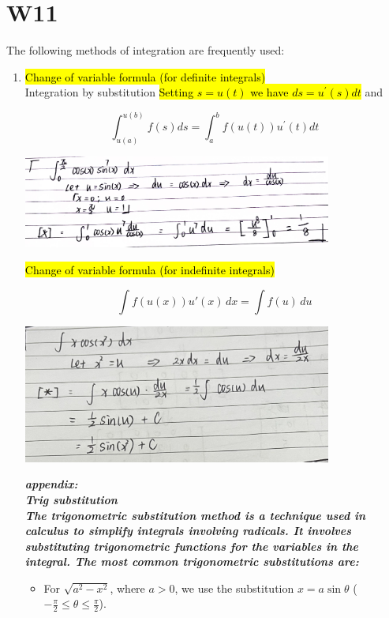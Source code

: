 \documentclass[10pt]{article}
\begin{document}
\section{W11}
The following methods of integration are frequently used:
\begin{enumerate}

\item \hl{Change of variable formula (for definite integrals)\\}Integration by substitution \hl{Setting $s=u(t)$ we have $d s=u^{\prime}(s) d t$} and

$$
\int_{u(a)}^{u(b)} f(s) d s=\int_{a}^{b} f(u(t)) u^{\prime}(t) d t
$$

\includegraphics[width=0.8\textwidth]{images/W11-2.jpeg}


\hl{Change of variable formula (for indefinite integrals)}

\[
\int f(u(x)) u'(x)\, dx = \int f(u)\, du
\]

\includegraphics[width=0.8\textwidth]{images/W11-1.jpeg}\\


\newpage



\textbf{\textit{appendix:\\Trig substitution\\The trigonometric substitution method is a technique used in calculus to simplify integrals involving radicals. It involves substituting trigonometric functions for the variables in the integral. The most common trigonometric substitutions are:}}\\

\begin{itemize}
  \item For $\sqrt{a^2-x^2}$, where $a > 0$, we use the substitution $x = a\sin\theta$ ($-\frac{\pi}{2} \leq \theta \leq \frac{\pi}{2}$).
  

\end{itemize}
\end{enumerate}
\end{document}
